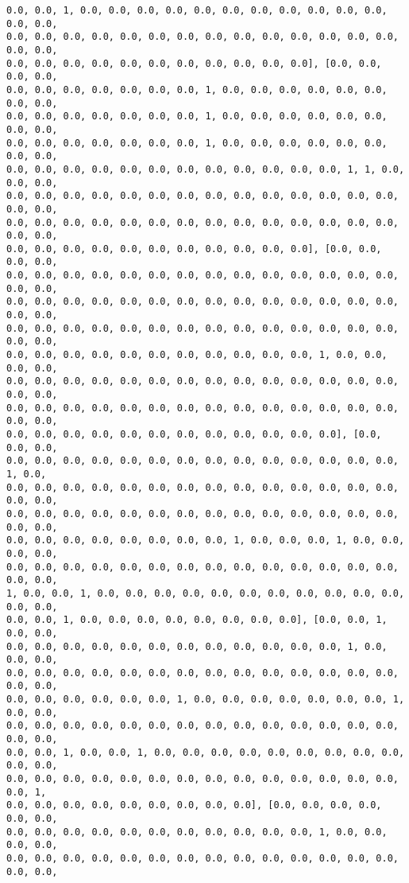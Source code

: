 \documentclass[11pt]{article}
\begin{document}
\begin{Verbatim}[commandchars=\\\{\}]
0.0, 0.0, 1, 0.0, 0.0, 0.0, 0.0, 0.0, 0.0, 0.0, 0.0, 0.0, 0.0, 0.0, 0.0, 0.0,
0.0, 0.0, 0.0, 0.0, 0.0, 0.0, 0.0, 0.0, 0.0, 0.0, 0.0, 0.0, 0.0, 0.0, 0.0, 0.0,
0.0, 0.0, 0.0, 0.0, 0.0, 0.0, 0.0, 0.0, 0.0, 0.0, 0.0], [0.0, 0.0, 0.0, 0.0,
0.0, 0.0, 0.0, 0.0, 0.0, 0.0, 0.0, 1, 0.0, 0.0, 0.0, 0.0, 0.0, 0.0, 0.0, 0.0,
0.0, 0.0, 0.0, 0.0, 0.0, 0.0, 0.0, 1, 0.0, 0.0, 0.0, 0.0, 0.0, 0.0, 0.0, 0.0,
0.0, 0.0, 0.0, 0.0, 0.0, 0.0, 0.0, 1, 0.0, 0.0, 0.0, 0.0, 0.0, 0.0, 0.0, 0.0,
0.0, 0.0, 0.0, 0.0, 0.0, 0.0, 0.0, 0.0, 0.0, 0.0, 0.0, 0.0, 1, 1, 0.0, 0.0, 0.0,
0.0, 0.0, 0.0, 0.0, 0.0, 0.0, 0.0, 0.0, 0.0, 0.0, 0.0, 0.0, 0.0, 0.0, 0.0, 0.0,
0.0, 0.0, 0.0, 0.0, 0.0, 0.0, 0.0, 0.0, 0.0, 0.0, 0.0, 0.0, 0.0, 0.0, 0.0, 0.0,
0.0, 0.0, 0.0, 0.0, 0.0, 0.0, 0.0, 0.0, 0.0, 0.0, 0.0], [0.0, 0.0, 0.0, 0.0,
0.0, 0.0, 0.0, 0.0, 0.0, 0.0, 0.0, 0.0, 0.0, 0.0, 0.0, 0.0, 0.0, 0.0, 0.0, 0.0,
0.0, 0.0, 0.0, 0.0, 0.0, 0.0, 0.0, 0.0, 0.0, 0.0, 0.0, 0.0, 0.0, 0.0, 0.0, 0.0,
0.0, 0.0, 0.0, 0.0, 0.0, 0.0, 0.0, 0.0, 0.0, 0.0, 0.0, 0.0, 0.0, 0.0, 0.0, 0.0,
0.0, 0.0, 0.0, 0.0, 0.0, 0.0, 0.0, 0.0, 0.0, 0.0, 0.0, 1, 0.0, 0.0, 0.0, 0.0,
0.0, 0.0, 0.0, 0.0, 0.0, 0.0, 0.0, 0.0, 0.0, 0.0, 0.0, 0.0, 0.0, 0.0, 0.0, 0.0,
0.0, 0.0, 0.0, 0.0, 0.0, 0.0, 0.0, 0.0, 0.0, 0.0, 0.0, 0.0, 0.0, 0.0, 0.0, 0.0,
0.0, 0.0, 0.0, 0.0, 0.0, 0.0, 0.0, 0.0, 0.0, 0.0, 0.0, 0.0], [0.0, 0.0, 0.0,
0.0, 0.0, 0.0, 0.0, 0.0, 0.0, 0.0, 0.0, 0.0, 0.0, 0.0, 0.0, 0.0, 0.0, 1, 0.0,
0.0, 0.0, 0.0, 0.0, 0.0, 0.0, 0.0, 0.0, 0.0, 0.0, 0.0, 0.0, 0.0, 0.0, 0.0, 0.0,
0.0, 0.0, 0.0, 0.0, 0.0, 0.0, 0.0, 0.0, 0.0, 0.0, 0.0, 0.0, 0.0, 0.0, 0.0, 0.0,
0.0, 0.0, 0.0, 0.0, 0.0, 0.0, 0.0, 0.0, 1, 0.0, 0.0, 0.0, 1, 0.0, 0.0, 0.0, 0.0,
0.0, 0.0, 0.0, 0.0, 0.0, 0.0, 0.0, 0.0, 0.0, 0.0, 0.0, 0.0, 0.0, 0.0, 0.0, 0.0,
1, 0.0, 0.0, 1, 0.0, 0.0, 0.0, 0.0, 0.0, 0.0, 0.0, 0.0, 0.0, 0.0, 0.0, 0.0, 0.0,
0.0, 0.0, 1, 0.0, 0.0, 0.0, 0.0, 0.0, 0.0, 0.0, 0.0], [0.0, 0.0, 1, 0.0, 0.0,
0.0, 0.0, 0.0, 0.0, 0.0, 0.0, 0.0, 0.0, 0.0, 0.0, 0.0, 0.0, 1, 0.0, 0.0, 0.0,
0.0, 0.0, 0.0, 0.0, 0.0, 0.0, 0.0, 0.0, 0.0, 0.0, 0.0, 0.0, 0.0, 0.0, 0.0, 0.0,
0.0, 0.0, 0.0, 0.0, 0.0, 0.0, 1, 0.0, 0.0, 0.0, 0.0, 0.0, 0.0, 0.0, 1, 0.0, 0.0,
0.0, 0.0, 0.0, 0.0, 0.0, 0.0, 0.0, 0.0, 0.0, 0.0, 0.0, 0.0, 0.0, 0.0, 0.0, 0.0,
0.0, 0.0, 1, 0.0, 0.0, 1, 0.0, 0.0, 0.0, 0.0, 0.0, 0.0, 0.0, 0.0, 0.0, 0.0, 0.0,
0.0, 0.0, 0.0, 0.0, 0.0, 0.0, 0.0, 0.0, 0.0, 0.0, 0.0, 0.0, 0.0, 0.0, 0.0, 1,
0.0, 0.0, 0.0, 0.0, 0.0, 0.0, 0.0, 0.0, 0.0], [0.0, 0.0, 0.0, 0.0, 0.0, 0.0,
0.0, 0.0, 0.0, 0.0, 0.0, 0.0, 0.0, 0.0, 0.0, 0.0, 0.0, 1, 0.0, 0.0, 0.0, 0.0,
0.0, 0.0, 0.0, 0.0, 0.0, 0.0, 0.0, 0.0, 0.0, 0.0, 0.0, 0.0, 0.0, 0.0, 0.0, 0.0,

\end{Verbatim}
\end{document}
